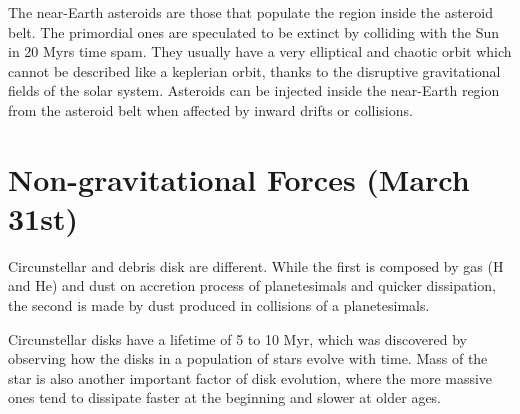 \documentclass[12pt,a4paper]{article}
\begin{document}
The near-Earth asteroids are those that populate the region inside the asteroid belt. The primordial ones are speculated to be extinct by colliding with the Sun in 20 Myrs time spam. They usually have a very elliptical and chaotic orbit which cannot be described like a keplerian orbit, thanks to the disruptive gravitational fields of the solar system. Asteroids can be injected inside the near-Earth region from the asteroid belt when affected by inward drifts or collisions.
\vspace{10mm}

\section{Non-gravitational Forces (March 31st)}
    
Circunstellar and debris disk are different. While the first is composed by gas (H and He) and dust on accretion process of planetesimals and quicker dissipation, the second is made by dust produced in collisions of a planetesimals.

Circunstellar disks have a lifetime of 5 to 10 Myr, which was discovered by observing how the disks in a population of stars evolve with time. Mass of the star is also another important factor of disk evolution, where the more massive ones tend to dissipate faster at the beginning and slower at older ages.
\end{document}
